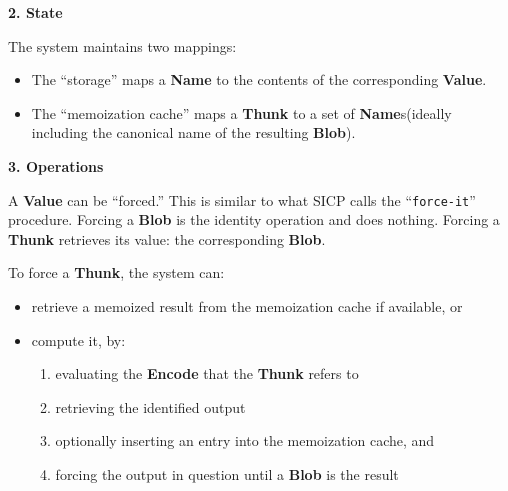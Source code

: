 \documentclass{article}
\newcommand{\blob}{\textbf{Blob}\xspace}
\newcommand{\valuex}{\textbf{Value}\xspace}
\newcommand{\encode}{\textbf{Encode}\xspace}
\newcommand{\thunk}{\textbf{Thunk}\xspace}
\newcommand{\name}{\textbf{Name}\xspace}
\newcommand{\names}{\textbf{Name}s\xspace}
\begin{document}
\vspace{0.5\baselineskip}
{\Large \textbf{2. State}}

The system maintains two mappings:
\begin{itemize}[topsep=0pt]
\item The ``storage'' maps a \name to the contents of the corresponding \valuex.

\item The ``memoization cache'' maps a \thunk to a set of \names (ideally including the canonical name of the resulting \blob).
\end{itemize}
  
\vspace{0.5\baselineskip}
{\Large \textbf{3. Operations}}

A \valuex can be ``forced.'' This is similar to what SICP calls the
``\texttt{force-it}'' procedure. Forcing a \blob is the identity
operation and does nothing. Forcing a \thunk retrieves its value: the
corresponding \blob.

To force a \thunk, the system can:
\begin{itemize}[topsep=0pt]
\item retrieve a memoized result from the memoization cache if available, or
\item compute it, by:
  \begin{enumerate}[topsep=0pt]
  \item evaluating the \encode that the \thunk refers to
  \item retrieving the identified output
  \item optionally inserting an entry into the memoization cache, and
  \item forcing the output in question until a \blob is the result
  \end{enumerate}
\end{itemize}
\end{document}
